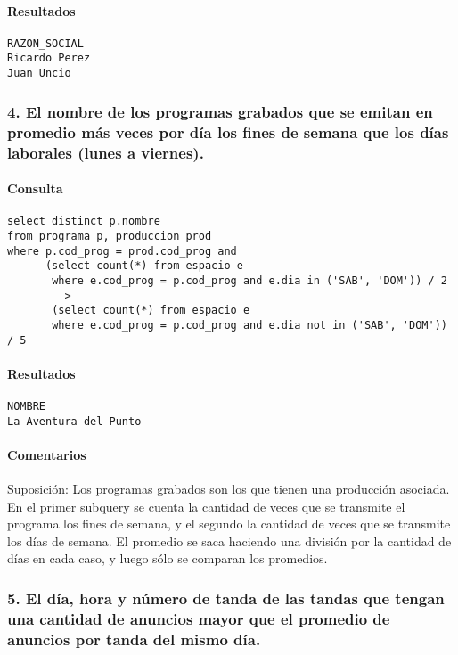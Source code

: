 \paragraph{Resultados}
\begin{verbatim} 
RAZON_SOCIAL
Ricardo Perez
Juan Uncio
\end{verbatim} 


\subsubsection*{4. El nombre de los programas grabados que se emitan en promedio m\'as veces por d\'ia los fines de semana que los d\'ias laborales (lunes a viernes).}

\paragraph{Consulta}
\begin{verbatim} 
select distinct p.nombre
from programa p, produccion prod
where p.cod_prog = prod.cod_prog and
      (select count(*) from espacio e 
       where e.cod_prog = p.cod_prog and e.dia in ('SAB', 'DOM')) / 2 
         >
       (select count(*) from espacio e 
       where e.cod_prog = p.cod_prog and e.dia not in ('SAB', 'DOM')) / 5
\end{verbatim}

\paragraph{Resultados}
\begin{verbatim} 
NOMBRE
La Aventura del Punto
\end{verbatim} 

\paragraph{Comentarios}
Suposici\'on: Los programas grabados son los que tienen una producci\'on asociada. \\

En el primer subquery se cuenta la cantidad de veces que se transmite el programa los fines de semana, y el segundo la cantidad de veces que se transmite los d\'ias de semana. El promedio se saca haciendo una divisi\'on por la cantidad de d\'ias en cada caso, y luego s\'olo se comparan los promedios.


\subsubsection*{5. El d\'ia, hora y n\'umero de tanda de las tandas que tengan una cantidad de anuncios mayor que el promedio de anuncios por tanda del mismo d\'ia.}


